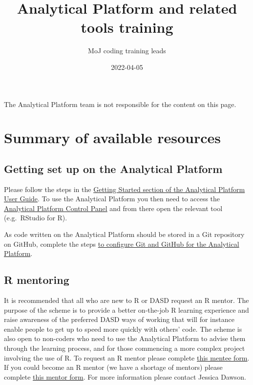 \documentclass[
]{book}
\title{Analytical Platform and related tools training}
\author{MoJ coding training leads}
\date{2022-04-05}
\begin{document}
\maketitle

{
\setcounter{tocdepth}{1}
\tableofcontents
}
The Analytical Platform team is not responsible for the content on this page.

\hypertarget{summary}{%
\chapter{Summary of available resources}\label{summary}}

\hypertarget{getting-set-up-on-the-analytical-platform}{%
\section{Getting set up on the Analytical Platform}\label{getting-set-up-on-the-analytical-platform}}

Please follow the steps in the \href{https://user-guidance.services.alpha.mojanalytics.xyz/get-started.html\#get-started}{Getting Started section of the Analytical Platform User Guide}. To use the Analytical Platform you then need to access the \href{https://controlpanel.services.alpha.mojanalytics.xyz/tools/}{Analytical Platform Control Panel} and from there open the relevant tool (e.g.~RStudio for R).

As code written on the Analytical Platform should be stored in a Git repository on GitHub, complete the steps \href{https://user-guidance.services.alpha.mojanalytics.xyz/github.html\#setup-github-keys-to-access-it-from-r-studio-and-jupyter}{to configure Git and GitHub for the Analytical Platform}.

\hypertarget{r-mentoring}{%
\section{R mentoring}\label{r-mentoring}}

It is recommended that all who are new to R or DASD request an R mentor. The purpose of the scheme is to provide a better on-the-job R learning experience and raise awareness of the preferred DASD ways of working that will for instance enable people to get up to speed more quickly with others' code. The scheme is also open to non-coders who need to use the Analytical Platform to advise them through the learning process, and for those commencing a more complex project involving the use of R. To request an R mentor please complete \href{https://forms.office.com/Pages/ResponsePage.aspx?id=KEeHxuZx_kGp4S6MNndq2PdkMZw8L-FEkMSL2t4Oet1UQVlWMUwzOVZRNUVKSTVZU0pPTUY0MDlZTSQlQCN0PWcu}{this mentee form}. If you could become an R mentor (we have a shortage of mentors) please complete \href{https://forms.office.com/Pages/ResponsePage.aspx?id=KEeHxuZx_kGp4S6MNndq2PdkMZw8L-FEkMSL2t4Oet1UNUw1N1M0NVNQSTNOVkdHOUtMQ1lMT0lHTSQlQCN0PWcu}{this mentor form}. For more information please contact Jessica Dawson.
\end{document}
